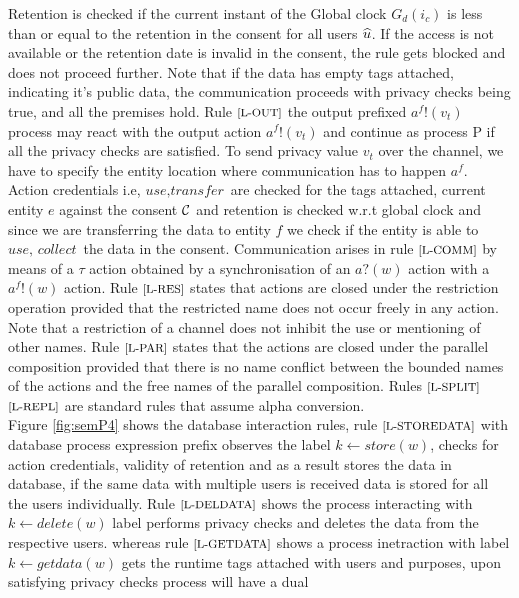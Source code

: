 Retention is checked if the current instant of the Global clock $G_d(i_c)$ is less than or equal to the retention in the consent for all users $ \widehat{u}$. If the access is not available or the retention date is invalid in the consent, the rule gets blocked and does not proceed further. %
Note that if the data has empty tags attached, indicating it's public data, the communication proceeds with privacy checks being true, and all the premises hold. Rule $ \scriptsize \text{[L-OUT]}$ the output prefixed $a^f!(v_t) $ process may react with the output action $ a^f!(v_t)$ and continue as process P if all the privacy checks are satisfied. To send privacy value $ v_t$ over the channel, we have to specify the entity location where communication has to happen $ a^f$. Action credentials i.e, $ \textit{use}, \textit{transfer}$ are checked for the tags attached, current entity $ e$ against the consent $ \mathcal{C}$ and retention is checked  w.r.t global clock and since we are transferring the data to entity $ f$ we check if the entity is able to $ \textit{use}, \textit{ collect}$ the data in the consent. Communication arises in rule $ \scriptsize \text{[L-COMM]}$ by means of a $ \tau $ action obtained by a synchronisation of an $ a?(w)$ action with a $ a^f!(w)$ action. Rule $ \scriptsize \text{[L-RES]}$ states that actions are closed under the restriction operation provided that the restricted name does not occur freely in any action. Note that a restriction of a channel does not inhibit the use or mentioning of other names.  Rule $\scriptsize  \text{[L-PAR]} $ states that the actions are closed under the parallel composition provided that there is no name conflict between the bounded names of the actions and the free names of the parallel composition.  Rules $ \scriptsize \text{[L-SPLIT]}$ $ \scriptsize \text{[L-REPL]}$ are standard rules that assume alpha conversion. \\
Figure \ref{fig:semP4} shows the database interaction rules, rule $ \scriptsize  \text{[L-STOREDATA]}$ with database process expression prefix observes the label $ k \leftarrow store(w) $, checks for action credentials, validity of retention and as a result stores the data in database, if the same data with multiple users is received data is stored for all the users individually. Rule  $ \scriptsize  \text{[L-DELDATA]}$ shows the process interacting with  $ k \leftarrow delete(w) $ label performs privacy checks and deletes the data from the respective users. whereas rule $ \scriptsize  \text{[L-GETDATA]}$ shows a process inetraction with label $ k \leftarrow getdata(w) $ gets the runtime tags attached with users and purposes, upon satisfying privacy checks process will have a dual  
